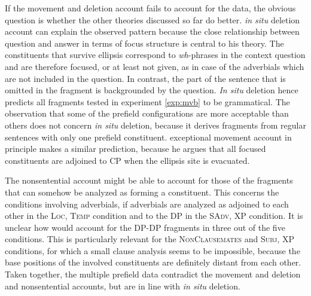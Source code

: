 If the movement and deletion account fails to account for the data, the obvious question is whether the other theories discussed so far do better.  \textit{in situ} deletion account can explain the observed pattern because the close relationship between question and answer in terms of focus structure is central to his theory. The constituents that survive ellipsis correspond to \textit{wh}-phrases in the context question and are therefore focused, or at least not given, as in case of the adverbials which are not included in the question. In contrast, the part of the sentence that is omitted in the fragment is backgrounded by the question. \textit{In situ} deletion hence predicts all fragments tested in experiment \ref{exp:mvb} to be grammatical. The observation that some of the prefield configurations are more acceptable than others does not concern \textit{in situ} deletion, because it derives fragments from regular sentences with only one prefield constituent.  exceptional movement account in principle makes a similar prediction, because he argues that all focused constituents are adjoined to CP when the ellipsis site is evacuated.

\noindent The nonsentential account might be able to account for those of the fragments that can somehow be analyzed as forming a constituent. This concerns the conditions involving adverbials, if adverbials are analyzed as adjoined to each other in the \textsc{Loc, Temp} condition and to the DP in the \textsc{SAdv, XP} condition. It is unclear how \citet{barton.progovac2005} would account for the DP-DP fragments in three out of the five conditions. This is particularly relevant for the \textsc{NonClausemates} and \textsc{Subj, XP} conditions, for which a small clause analysis seems to be impossible, because the base positions of the involved constituents are definitely distant from each other. Taken together, the multiple prefield data contradict the movement and deletion and nonsentential accounts, but are in line with \textit{in situ} deletion.


